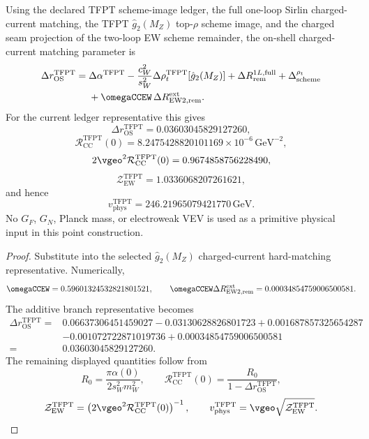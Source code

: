 \begin{theorem}
\label{thm:charged-current-point-closure}
Using the declared TFPT scheme-image ledger, the full one-loop Sirlin charged-current matching, the
TFPT $\hat g_2(M_Z)$ top-$\rho$ scheme image, and the charged seam projection of the two-loop EW
scheme remainder, the on-shell charged-current matching parameter is
\begin{equation}
\label{eq:tfpt-point-closed-deltar}
\begin{aligned}
\Delta r_{\mathrm{OS}}^{\mathrm{TFPT}}
={}&
\Delta\alpha^{\mathrm{TFPT}}
-
\frac{c_W^2}{s_W^2}\Delta\rho_t^{\mathrm{TFPT}}[\hat g_2(M_Z)]
+
\Delta R_{\mathrm{rem}}^{1L,\mathrm{full}}
+
\Delta_{\mathrm{scheme}}^{\rho_t}
\\
&+
\omegaCCEW\,
\Delta R_{\mathrm{EW2},\mathrm{rem}}^{\mathrm{ext}}.
\end{aligned}
\end{equation}
For the current ledger representative this gives
\[
\Delta r_{\mathrm{OS}}^{\mathrm{TFPT}}
=
0.03603045829127260,
\]
\[
\mathcal R_{\mathrm{CC}}^{\mathrm{TFPT}}(0)
=
8.2475428820101169\times10^{-6}\,\mathrm{GeV}^{-2},
\]
\[
2\vgeo^2\mathcal R_{\mathrm{CC}}^{\mathrm{TFPT}}(0)
=
0.9674858756228490,
\]
\[
\mathcal Z_{\mathrm{EW}}^{\mathrm{TFPT}}
=
1.0336068207261621,
\]
and hence
\[
v_{\mathrm{phys}}^{\mathrm{TFPT}}
=
246.21965079421770\,\mathrm{GeV}.
\]
No $G_F$, $G_N$, Planck mass, or electroweak VEV is used as a primitive physical input in this point
construction.
\end{theorem}

\begin{proof}
Substitute  into the selected $\hat g_2(M_Z)$ charged-current
hard-matching representative. Numerically,
\[
\omegaCCEW=0.59601324532821801521,
\qquad
\omegaCCEW\Delta R_{\mathrm{EW2},\mathrm{rem}}^{\mathrm{ext}}
=
0.00034854759006500581.
\]
The additive branch representative becomes
\[
\begin{aligned}
\Delta r_{\mathrm{OS}}^{\mathrm{TFPT}}
={}&
0.06637306451459027
-0.03130628826801723
+0.001687857325654287
\\
&-0.001072722871019736
+0.00034854759006500581
\\
={}&
0.03603045829127260.
\end{aligned}
\]
The remaining displayed quantities follow from
\[
R_0=\frac{\pi\alpha(0)}{2s_W^2m_W^2},
\qquad
\mathcal R_{\mathrm{CC}}^{\mathrm{TFPT}}(0)=\frac{R_0}{1-\Delta r_{\mathrm{OS}}^{\mathrm{TFPT}}},
\]
\[
\mathcal Z_{\mathrm{EW}}^{\mathrm{TFPT}}
=
\left(2\vgeo^2\mathcal R_{\mathrm{CC}}^{\mathrm{TFPT}}(0)\right)^{-1},
\qquad
v_{\mathrm{phys}}^{\mathrm{TFPT}}
=
\vgeo\sqrt{\mathcal Z_{\mathrm{EW}}^{\mathrm{TFPT}}}.
\]
\end{proof}

